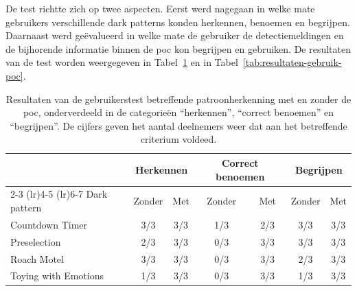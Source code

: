 \vspace{1em}

De test richtte zich op twee aspecten. Eerst werd nagegaan in welke mate gebruikers verschillende dark patterns konden herkennen, benoemen en begrijpen. Daarnaast werd geëvalueerd in welke mate de gebruiker de detectiemeldingen en de bijhorende informatie binnen de \acrshort{poc} kon begrijpen en gebruiken. De resultaten van de test worden weergegeven in Tabel~\ref{tab:resultaten-patroonherkenning} en in Tabel~\ref{tab:resultaten-gebruik-poc}.

\vspace{1em}

\begin{table}[H]
    \centering
    \begin{tabular}{lcccccc}
        \toprule
        & \multicolumn{2}{c}{Herkennen}
        & \multicolumn{2}{c}{Correct benoemen}
        & \multicolumn{2}{c}{Begrijpen} \\
        \cmidrule(lr){2-3}
        \cmidrule(lr){4-5}
        \cmidrule(lr){6-7}
        Dark pattern
        & Zonder & Met
        & Zonder & Met
        & Zonder & Met \\
        \midrule
        Countdown Timer
        & 3/3 & 3/3
        & 1/3 & 2/3
        & 3/3 & 3/3 \\
        Preselection
        & 2/3 & 3/3
        & 0/3 & 3/3
        & 3/3 & 3/3 \\
        Roach Motel
        & 3/3 & 3/3
        & 0/3 & 3/3
        & 2/3 & 3/3 \\
        Toying with Emotions
        & 1/3 & 3/3
        & 0/3 & 3/3
        & 1/3 & 3/3 \\
        \bottomrule
    \end{tabular}
    \caption[Resultaten van de gebruikerstest betreffende patroonherkenning]{Resultaten van de gebruikerstest betreffende patroonherkenning met en zonder de \acrshort{poc}, onderverdeeld in de categorieën ``herkennen'', ``correct benoemen'' en ``begrijpen''. De cijfers geven het aantal deelnemers weer dat aan het betreffende criterium voldeed.}
    \label{tab:resultaten-patroonherkenning}
\end{table}

\vspace{1em}

